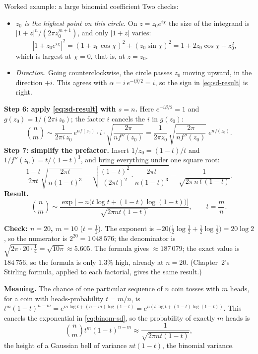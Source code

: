\documentclass[11pt]{beamer}
\begin{document}
\begin{frame}[allowframebreaks=1.00]{Worked example: a large binomial coefficient}
Two checks:
\begin{itemize}
  \item \emph{\(z_0\) is the highest point on this circle.} On \(z=z_0e^{i\chi}\) the size of the integrand is
        \(|1+z|^n/(2\pi z_0^{m+1})\), and only \(|1+z|\) varies:
        \[
         |1+z_0e^{i\chi}|^2=(1+z_0\cos\chi)^2+(z_0\sin\chi)^2=1+2z_0\cos\chi+z_0^2 ,
        \]
        which is largest at \(\chi=0\), that is, at \(z=z_0\).
  \item \emph{Direction.} Going counterclockwise, the circle passes \(z_0\) moving upward, in the
        direction \(+i\). This agrees with \(\alpha=i\,e^{-i\beta/2}=i\), so the sign in \eqref{eq:sd-result} is right.
\end{itemize}
\par\framebreak\par
\textbf{Step 6: apply \eqref{eq:sd-result} with \(s=n\).} Here \(e^{-i\beta/2}=1\) and \(g(z_0)=1/(2\pi i\,z_0)\); the factor
\(i\) cancels the \(i\) in \(g(z_0)\):
\[
  \binom nm
  \sim
  \frac{1}{2\pi i\,z_0}\,e^{nf(z_0)}\cdot i\cdot
  \sqrt{\frac{2\pi}{n f''(z_0)}}
  =
  \frac{1}{2\pi z_0}\,\sqrt{\frac{2\pi}{n f''(z_0)}}\;e^{nf(z_0)} .
\]
\textbf{Step 7: simplify the prefactor.} Insert \(1/z_0=(1-t)/t\) and \(1/f''(z_0)=t/(1-t)^3\), and bring
everything under one square root:
\[
  \frac{1-t}{2\pi t}\sqrt{\frac{2\pi t}{n(1-t)^3}}
  =\sqrt{\frac{(1-t)^2}{(2\pi t)^2}\cdot\frac{2\pi t}{n(1-t)^3}}
  =\frac{1}{\sqrt{2\pi\,n\,t\,(1-t)}} .
\]
\textbf{Result.}
\begin{equation}
  \binom nm
  \sim
  \frac{\exp\bigl[-n\bigl(t\log t+(1-t)\log(1-t)\bigr)\bigr]}
       {\sqrt{2\pi n t(1-t)}},\qquad t=\frac mn .
  \label{eq:binom-sd}
\end{equation}
\par\framebreak\par
\textbf{Check: \(n=20\), \(m=10\)} (\(t=\tfrac12\)). The exponent is
\(-20\bigl(\tfrac12\log\tfrac12+\tfrac12\log\tfrac12\bigr)=20\log2\), so the numerator is \(2^{20}=1\,048\,576\); the
denominator is \(\sqrt{2\pi\cdot20\cdot\tfrac14}=\sqrt{10\pi}\approx5.605\). The formula gives \(\approx187\,079\); the exact
value is \(184\,756\), so the formula is only \(1.3\%\) high, already at \(n=20\). (Chapter~2's Stirling
formula, applied to each factorial, gives the same result.)

\textbf{Meaning.} The chance of one particular sequence of \(n\) coin tosses with \(m\) heads, for a coin
with heads-probability \(t=m/n\), is
\(t^m(1-t)^{n-m}=e^{m\log t+(n-m)\log(1-t)}=e^{n(t\log t+(1-t)\log(1-t))}\). This cancels the exponential
in \eqref{eq:binom-sd}, so the probability of exactly \(m\) heads is
\[
  \binom nm t^m(1-t)^{n-m}\approx\frac{1}{\sqrt{2\pi nt(1-t)}} ,
\]
the height of a Gaussian bell of variance \(nt(1-t)\), the binomial variance.
\end{frame}
\end{document}

